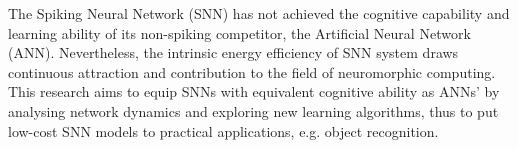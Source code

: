 % 
%
%

The Spiking Neural Network (SNN) has not achieved the cognitive capability and learning ability of its non-spiking competitor, the Artificial Neural Network (ANN).
Nevertheless, the intrinsic energy efficiency of SNN system draws continuous attraction and contribution to the field of neuromorphic computing.
This research aims to equip SNNs with equivalent cognitive ability as ANNs' by analysing network dynamics and exploring new learning algorithms, thus to put low-cost SNN models to practical applications, e.g. object recognition.

